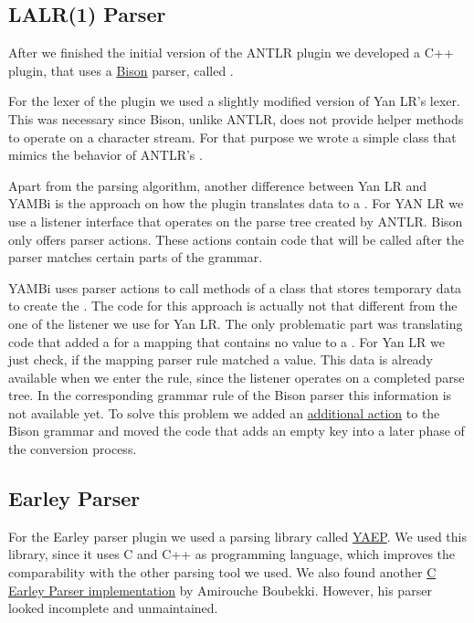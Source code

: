 \subsection{LALR(1) Parser}

After we finished the initial version of the \gls{ANTLR} plugin \LinkYanLR{} we developed a C++ plugin, that uses a \href{https://www.gnu.org/software/bison}{Bison} parser, called \LinkYAMBi{}.

For the lexer of the plugin we used a slightly modified version of Yan LR’s lexer. This was necessary since Bison, unlike \gls{ANTLR}, does not provide helper methods to operate on a character stream. For that purpose we wrote a simple class that mimics the behavior of \gls{ANTLR}’s .

Apart from the parsing algorithm, another difference between Yan LR and YAMBi is the approach on how the plugin translates  data to a . For YAN LR we use a listener interface that operates on the parse tree created by \gls{ANTLR}. Bison only offers parser actions. These actions contain code that will be called after the parser matches certain parts of the grammar.

YAMBi uses parser actions to call methods of a class that stores temporary data to create the . The code for this approach is actually not that different from the one of the listener we use for Yan LR. The only problematic part was translating code that added a  for a  mapping that contains no value to a . For Yan LR we just check, if the mapping parser rule matched a value. This data is already available when we enter the rule, since the listener operates on a completed parse tree. In the corresponding grammar rule of the Bison parser this information is not available yet. To solve this problem we added an \href{https://git.libelektra.org/blob/0c47d024256d0824577209d95d69876722af6248/src/plugins/yambi/parser.ypp#L63-L66}{additional action} to the Bison grammar and moved the code that adds an empty key into a later phase of the conversion process.

\subsection{Earley Parser}
\label{sec:earley_parser}

For the Earley parser plugin we used a parsing library called \href{https://github.com/vnmakarov/yaep}{\gls{YAEP}}. We used this library, since it uses C and C++ as programming language, which improves the comparability with the other parsing tool we used. We also found another \href{https://bitbucket.org/amirouche/c-earley-parser/src/default/src/earley_items.c}{C Earley Parser implementation} by Amirouche Boubekki. However, his parser looked incomplete and unmaintained.

